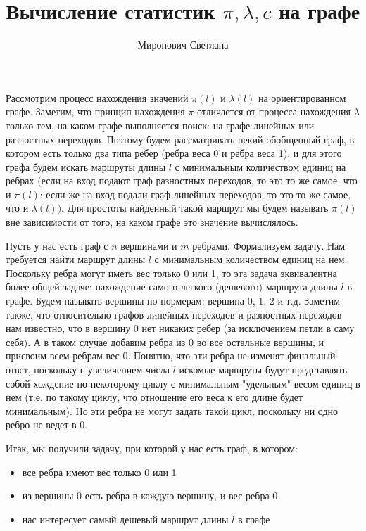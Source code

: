 \documentclass[a4paper,12pt]{article}
\title{Вычисление статистик $\pi, \lambda, c$ на графе}
\date{}
\author{Миронович Светлана}
\begin{document}
  \maketitle

Рассмотрим  процесс нахождения значений $\pi(l)$ и $\lambda(l)$ на ориентированном графе. Заметим, что принцип нахождения $\pi$ отличается от процесса нахождения $\lambda$ только тем, на каком графе выполняется поиск: на графе линейных или разностных переходов. Поэтому будем рассматривать некий обобщенный граф, в котором есть только два типа ребер (ребра веса 0 и ребра веса 1), и для этого графа будем искать маршруты длины $l$ с минимальным количеством единиц на ребрах (если на вход подают граф разностных переходов, то это то же самое, что и $\pi(l)$; если же на вход подали граф линейных переходов, то это то же самое, что и $\lambda(l))$. Для простоты найденный такой маршрут мы будем называть $\pi(l)$ вне зависимости от того, на каком графе это значение вычислялось.

Пусть у нас есть граф с $n$ вершинами и $m$ ребрами. Формализуем задачу. Нам требуется найти маршрут длины $l$ с минимальным количеством единиц на нем. Поскольку ребра могут иметь вес только 0 или 1, то эта задача эквивалентна более общей задаче: нахождение самого легкого (дешевого) маршрута длины $l$ в графе. Будем называть вершины по нормерам: вершина 0, 1, 2 и т.д.  Заметим также, что относительно графов линейных переходов и разностных переходов нам известно, что в вершину 0 нет никаких ребер (за исключением петли в саму себя). А в таком случае добавим ребра из 0 во все остальные вершины, и присвоим всем ребрам вес 0. Понятно, что эти ребра не изменят финальный ответ, поскольку с увеличением числа $l$ искомые маршруты будут представлять собой хождение по некоторому циклу с минимальным "удельным" весом единиц в нем (т.е. по такому циклу, что отношение его веса к его длине будет минимальным). Но эти ребра не могут задать такой цикл, поскольку ни одно ребро не ведет в 0. 

Итак, мы получили задачу, при которой у нас есть граф, в котором:

\begin{itemize}
  \item все ребра имеют вес только 0 или 1
  \item из вершины 0 есть ребра в каждую вершину, и вес ребра 0
  \item нас интересует самый дешевый маршрут длины $l$ в графе
\end{itemize}
\end{document}
